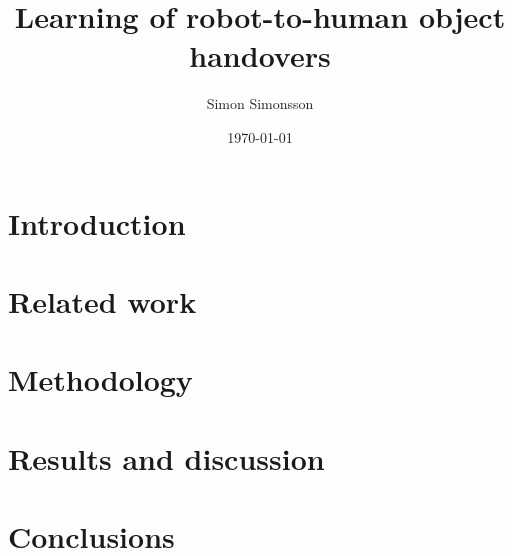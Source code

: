 \documentclass{kththesis}
\title{Learning of robot-to-human object handovers}
\author{Simon Simonsson}
\date{\today}
\begin{document}

\cleardoublepage

\frontmatter %
\titlepage

\begin{abstract}
	
\end{abstract}

\begin{otherlanguage}{swedish}
	\begin{abstract}
		
	\end{abstract}
\end{otherlanguage}

\tableofcontents

\mainmatter %

\chapter{Introduction}


\chapter{Related work}


\chapter{Methodology}


\chapter{Results and discussion}


\chapter{Conclusions}


\printbibliography[heading=bibintoc] %

\appendix


\cleardoublepage

\end{document}
